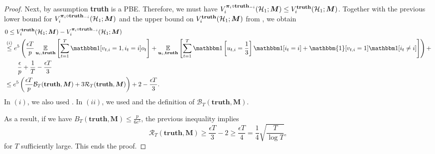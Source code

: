 \begin{proof}
    Next, by assumption \textbf{truth} is a PBE. Therefore, we must have $V_i^{\bm\pi_i\circ \textbf{truth}_{-i}}(\mathcal{H}_1;\bm M) \leq V_i^{\textbf{truth}}(\mathcal{H}_1;\bm M)$. Together with the previous lower bound for $V_i^{\bm\pi_i\circ \textbf{truth}_{-i}}(\mathcal{H}_1;\bm M)$ and the upper bound on $V_i^{\textbf{truth}}(\mathcal{H}_1;\bm M)$ from , we obtain
    \begin{align*}
        &0\leq  V_i^{\textbf{truth}}(\mH_1;\bm M) - V_i^{\bm\pi_i\circ \textbf{truth}_{-i}}(\mH_1;\bm M) \\
        &\overset{(i)}{\leq} e^{5} \paren{ \frac{\epsilon T}{p} \E_{\bm u_i,\textbf{truth}}\sqb{\sum_{t=1}^T \1[v_{t,i}=1,i_t=i]o_t} +  \E_{\bm u_i,\textbf{truth}} \sqb{\sum_{t=1}^T \1\sqb{u_{t,i}=\frac{1}{3}}\1[i_t=i] + \mathbbm{1}[v_{t,i}=1]\1[i_t\neq i]  }} +\\
        &\qquad \frac{\epsilon}{p}+\frac{1}{T}  - \frac{\epsilon T}{3}\\
        &\leq e^5\paren{\frac{\epsilon T}{p}\mathcal B_T(\textbf{truth},\bm M) + 3\mathcal R_T(\textbf{truth},\bm M)} + 2 - \frac{\epsilon T}{3}.
    \end{align*}
    In $(i)$, we also used . In $(ii)$, we used  and the definition of $\mathcal B_T(\textbf{truth},\bm M)$.

    As a result, if we have $B_T(\textbf{truth},\bm M) \leq \frac{p}{6e^5}$, the previous inequality implies
    \begin{equation*}
        \mathcal R_T(\textbf{truth},\bm M) \geq \frac{\epsilon T}{3}-2\geq \frac{\epsilon T}{4} = \frac{1}{4}\sqrt{\frac{T}{\log T}},
    \end{equation*}
    for $T$ sufficiently large. This ends the proof.
\end{proof}
